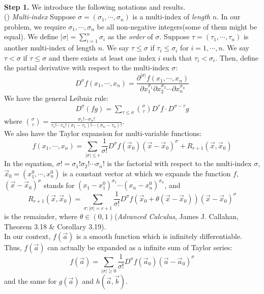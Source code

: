 \documentclass[12pt]{article}
\begin{document}
\\
\textbf{Step 1. } We introduce the following notations and results.\\
() \emph{Multi-index} Suppose $\sigma = (\sigma_{1},\cdots,\sigma_{n})$ is a multi-index of \emph{length} $n$. In our problem, we require $\sigma_{1},\cdots,\sigma_{n}$ be all non-negative integers(some of them might be equal). We define $|\sigma|=\sum_{i=1}^{n}\sigma_{i}$ as the \emph{order} of $\sigma$. Suppose $\tau=(\tau_{1},\cdots,\tau_{n})$ is another multi-index of length $n$. We say $\tau\leqslant \sigma$ if $\tau_{i}\leqslant \sigma_{i}$ for $i=1,\cdots,n$. We say $\tau<\sigma$ if $\tau\leqslant \sigma$ and there exists at least one index $i$ such that $\tau_{i}<\sigma_{i}$. Then, define the partial derivative with respect to the multi-index $\sigma$:
$$D^{\sigma}f(x_{1},\cdots,x_{n})=\frac{\partial^{|\sigma|}f(x_{1},\cdots,x_{n})}{\partial x_{1}^{\sigma_{1}}\partial x_{2}^{\sigma_{2}}\cdots \partial x_{n}^{\sigma_{n}}}$$ We have the general Leibniz rule:
\begin{align*}
	D^{\sigma}(fg)=\sum_{\tau\leqslant\sigma}\binom{\sigma}{\tau}D^{\tau}f\cdot D^{\sigma-\tau}g
\end{align*}
where $\binom{\sigma}{\tau}=\frac{\sigma_{1}!\cdots\sigma_{n}!}{\tau_{1}!\cdots\tau_{n}!(\sigma_{1}-\tau_{1})!\cdots(\sigma_{n}-\tau_{n})!}$.\\
We also have the Taylor expansion for multi-variable functions:
$$f(x_{1},\cdots,x_{n})=\sum_{|\sigma|\leqslant r}\frac{1}{\sigma!}D^{\sigma}f(\vec{x}_{0})(\vec{x}-\vec{x}_{0})^{\sigma}+R_{r+1}(\vec{x},\vec{x}_{0})$$ 
In the equation, $\sigma!=\sigma_{1}!\sigma_{2}!\cdots\sigma_{n}!$ is the factorial with respect to the multi-index $\sigma$, $\vec{x}_{0}=(x_{1}^{0},\cdots,x_{n}^{0})$ is a constant vector at which we expands the function $f$, $(\vec{x}-\vec{x}_{0})^{\sigma}$ stands for $(x_{1}-x_{1}^{0})^{\sigma_{1}}\cdots(x_{n}-x_{n}^{0})^{\sigma_{n}}$, and $$R_{r+1}(\vec{x},\vec{x}_{0})=\sum_{\sigma:|\sigma|=r+1}\frac{1}{\sigma!}D^{\sigma}f(\vec{x}_{0}+\theta(\vec{x}-\vec{x}_{0}))(\vec{x}-\vec{x}_{0})^{\sigma}$$ is the remainder, where $\theta\in (0,1)$(\emph{Advanced Calculus}, James J. Callahan, Theorem 3.18 \& Corollary 3.19).\\
In our context, $f(\vec{a})$ is a smooth function which is infinitely differentiable. Thus, $f(\vec{a})$ can actually be expanded as a infinite sum of Taylor series:
$$f(\vec{a})=\sum_{|\sigma|\geqslant 0}\frac{1}{\sigma!}D^{\sigma}f(\vec{a}_{0})(\vec{a}-\vec{a}_{0})^{\sigma}$$ and the same for $g(\vec{a})$ and $h(\vec{a},\vec{b})$.\\
\end{document}
